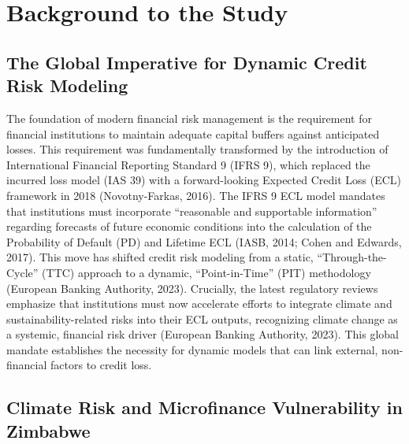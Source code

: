 \documentclass[12pt,a4paper]{article}
\begin{document}
\vspace{1cm}

\section{Background to the Study}

\subsection{The Global Imperative for Dynamic Credit Risk Modeling}

The foundation of modern financial risk management is the requirement for financial institutions to maintain adequate capital buffers against anticipated losses. This requirement was fundamentally transformed by the introduction of International Financial Reporting Standard 9 (IFRS 9), which replaced the incurred loss model (IAS 39) with a forward-looking Expected Credit Loss (ECL) framework in 2018 (Novotny-Farkas, 2016). The IFRS 9 ECL model mandates that institutions must incorporate ``reasonable and supportable information'' regarding forecasts of future economic conditions into the calculation of the Probability of Default (PD) and Lifetime ECL (IASB, 2014; Cohen and Edwards, 2017). This move has shifted credit risk modeling from a static, ``Through-the-Cycle'' (TTC) approach to a dynamic, ``Point-in-Time'' (PIT) methodology (European Banking Authority, 2023). Crucially, the latest regulatory reviews emphasize that institutions must now accelerate efforts to integrate climate and sustainability-related risks into their ECL outputs, recognizing climate change as a systemic, financial risk driver (European Banking Authority, 2023). This global mandate establishes the necessity for dynamic models that can link external, non-financial factors to credit loss.

\subsection{Climate Risk and Microfinance Vulnerability in Zimbabwe}
\end{document}
